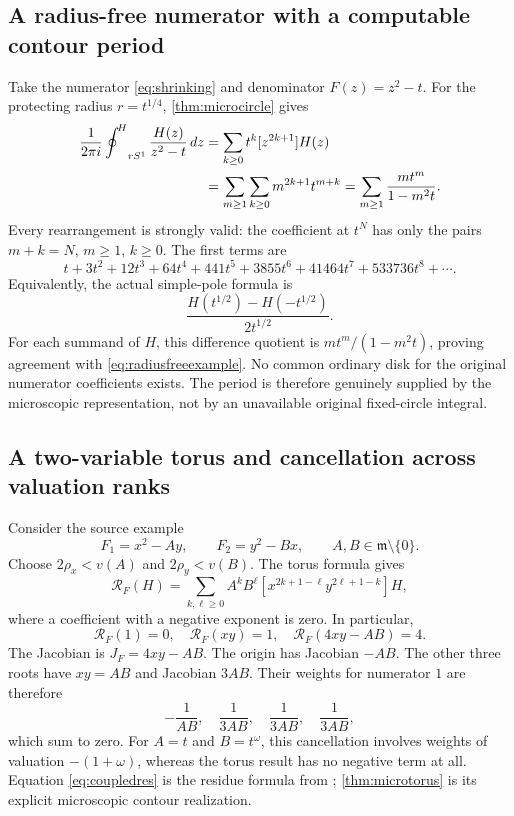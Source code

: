 \documentclass[11pt,letterpaper]{article}
\theoremstyle{definition}
\theoremstyle{remark}
\newcommand{\m}{\mathfrak m}\newcommand{\st}{\operatorname{st}}
\newcommand{\HCoint}{\mathop{\oint^{\!H}}\nolimits}
\numberwithin{equation}{section}
\begin{document}
\subsection{A radius-free numerator with a computable contour period}\label{subsec:radiusfreeexample}
Take the numerator \eqref{eq:shrinking} and denominator $F(z)=z^2-t$. For the protecting radius $r=t^{1/4}$, \cref{thm:microcircle} gives
\begin{align}\label{eq:radiusfreeexample}
 \frac1{2\pi i}\HCoint_{rS^1}\frac{H(z)}{z^2-t}\dd z
 &=\sum_{k\ge0}t^k[z^{2k+1}]H(z)\notag\\
 &=\sum_{m\ge1}\sum_{k\ge0}m^{2k+1}t^{m+k}
 =\sum_{m\ge1}\frac{m t^m}{1-m^2t}.
\end{align}
Every rearrangement is strongly valid: the coefficient at $t^N$ has only the pairs $m+k=N$, $m\ge1$, $k\ge0$. The first terms are
\begin{equation}\label{eq:radiusfreenumbers}
 t+3t^2+12t^3+64t^4+441t^5+3855t^6+41464t^7+533736t^8+\cdots.
\end{equation}
Equivalently, the actual simple-pole formula is
\[
 \frac{H(t^{1/2})-H(-t^{1/2})}{2t^{1/2}}.
\]
For each summand of $H$, this difference quotient is $m t^m/(1-m^2t)$, proving agreement with \eqref{eq:radiusfreeexample}. No common ordinary disk for the original numerator coefficients exists. The period is therefore genuinely supplied by the microscopic representation, not by an unavailable original fixed-circle integral.

\subsection{A two-variable torus and cancellation across valuation ranks}
Consider the source example
\[
 F_1=x^2-Ay,\qquad F_2=y^2-Bx,\qquad A,B\in\m\setminus\{0\}.
\]
Choose $2\rho_x<v(A)$ and $2\rho_y<v(B)$. The torus formula gives
\begin{equation}\label{eq:coupledres}
 \mathcal R_F(H)=\sum_{k,\ell\ge0}A^kB^\ell
 [x^{2k+1-\ell}y^{2\ell+1-k}]H,
\end{equation}
where a coefficient with a negative exponent is zero. In particular,
\[
 \mathcal R_F(1)=0,\quad \mathcal R_F(xy)=1,\quad
 \mathcal R_F(4xy-AB)=4.
\]
The Jacobian is $J_F=4xy-AB$. The origin has Jacobian $-AB$. The other three roots have $xy=AB$ and Jacobian $3AB$. Their weights for numerator $1$ are therefore
\[
 -\frac1{AB},\quad\frac1{3AB},\quad\frac1{3AB},\quad\frac1{3AB},
\]
which sum to zero. For $A=t$ and $B=t^\omega$, this cancellation involves weights of valuation $-(1+\omega)$, whereas the torus result has no negative term at all. Equation \eqref{eq:coupledres} is the residue formula from \cite{Geometry}; \cref{thm:microtorus} is its explicit microscopic contour realization.
\end{document}
